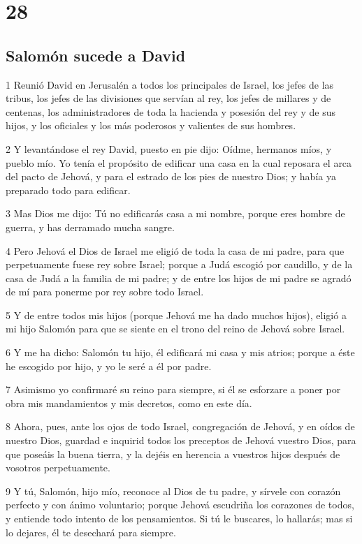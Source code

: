 \chapter{28}

\section*{Salomón sucede a David}

\par 1 Reunió David en Jerusalén a todos los principales de Israel, los jefes de las tribus, los jefes de las divisiones que servían al rey, los jefes de millares y de centenas, los administradores de toda la hacienda y posesión del rey y de sus hijos, y los oficiales y los más poderosos y valientes de sus hombres.
\par 2 Y levantándose el rey David, puesto en pie dijo: Oídme, hermanos míos, y pueblo mío. Yo tenía el propósito de edificar una casa en la cual reposara el arca del pacto de Jehová, y para el estrado de los pies de nuestro Dios; y había ya preparado todo para edificar. 
\par 3 Mas Dios me dijo: Tú no edificarás casa a mi nombre, porque eres hombre de guerra, y has derramado mucha sangre.
\par 4 Pero Jehová el Dios de Israel me eligió de toda la casa de mi padre, para que perpetuamente fuese rey sobre Israel; porque a Judá escogió por caudillo, y de la casa de Judá a la familia de mi padre; y de entre los hijos de mi padre se agradó de mí para ponerme por rey sobre todo Israel.
\par 5 Y de entre todos mis hijos (porque Jehová me ha dado muchos hijos), eligió a mi hijo Salomón para que se siente en el trono del reino de Jehová sobre Israel.
\par 6 Y me ha dicho: Salomón tu hijo, él edificará mi casa y mis atrios; porque a éste he escogido por hijo, y yo le seré a él por padre.
\par 7 Asimismo yo confirmaré su reino para siempre, si él se esforzare a poner por obra mis mandamientos y mis decretos, como en este día. 
\par 8 Ahora, pues, ante los ojos de todo Israel, congregación de Jehová, y en oídos de nuestro Dios, guardad e inquirid todos los preceptos de Jehová vuestro Dios, para que poseáis la buena tierra, y la dejéis en herencia a vuestros hijos después de vosotros perpetuamente.
\par 9 Y tú, Salomón, hijo mío, reconoce al Dios de tu padre, y sírvele con corazón perfecto y con ánimo voluntario; porque Jehová escudriña los corazones de todos, y entiende todo intento de los pensamientos. Si tú le buscares, lo hallarás; mas si lo dejares, él te desechará para siempre.
